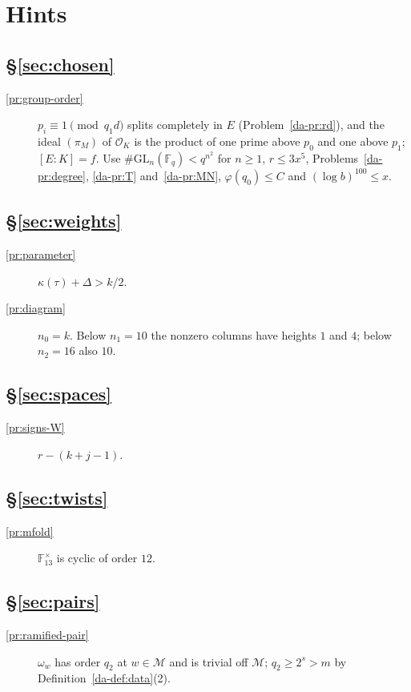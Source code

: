 \documentclass[reqno]{amsart}
\theoremstyle{plain}
\theoremstyle{definition}
\newcommand{\Oc}{\mathcal O}
\begin{document}
\section*{Hints}

\subsection*{\S\ref{sec:chosen}}
\begin{description}
\item[\ref{pr:group-order}] \(p_i \equiv 1 \pmod{q_1 d}\) splits completely in \(E\) (Problem~\ref{da-pr:rd}), and the ideal \((\pi_M)\) of \(\Oc_K\) is the product of one prime above \(p_0\) and one above \(p_1\); \([E : K] = f\).  Use \(\#\mathrm{GL}_n(\mathbb F_q) < q^{n^2}\) for \(n \ge 1\), \(r \le 3x^5\), Problems~\ref{da-pr:degree}, \ref{da-pr:T} and~\ref{da-pr:MN}, \(\varphi(q_0) \le C\) and \((\log b)^{100} \le x\).
\end{description}

\subsection*{\S\ref{sec:weights}}
\begin{description}
\item[\ref{pr:parameter}] \(\kappa(\tau) + \Delta > k/2\).
\item[\ref{pr:diagram}] \(n_0 = k\).  Below \(n_1 = 10\) the nonzero columns have heights \(1\) and \(4\); below \(n_2 = 16\) also \(10\).
\end{description}

\subsection*{\S\ref{sec:spaces}}
\begin{description}
\item[\ref{pr:signs-W}] \(r - (k + j - 1)\).
\end{description}

\subsection*{\S\ref{sec:twists}}
\begin{description}
\item[\ref{pr:mfold}] \(\mathbb F_{13}^\times\) is cyclic of order \(12\).
\end{description}

\subsection*{\S\ref{sec:pairs}}
\begin{description}
\item[\ref{pr:ramified-pair}] \(\omega_w\) has order \(q_2\) at \(w \in \mathcal M\) and is trivial off \(\mathcal M\); \(q_2 \ge 2^s > m\) by Definition~\ref{da-def:data}(2).
\end{description}
\end{document}
